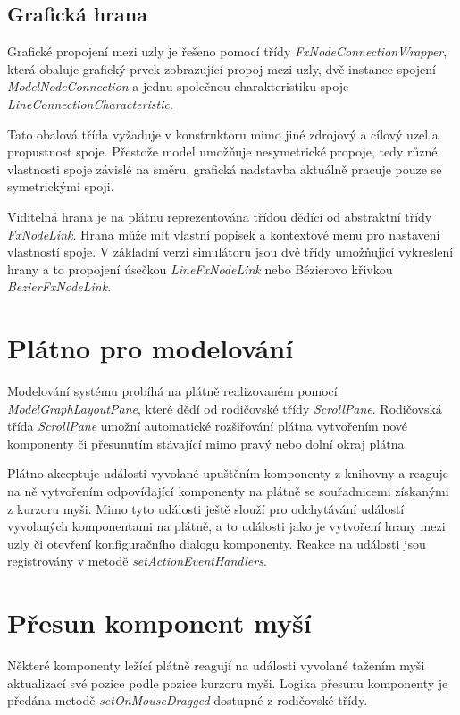 \documentclass[czech,DP]{thesiskiv}
\begin{document}
\subsection{Grafická hrana}

Grafické propojení mezi uzly je řešeno pomocí třídy \textit{FxNodeConnectionWrapper}, která obaluje grafický prvek zobrazující propoj mezi uzly, dvě instance spojení \textit{ModelNodeConnection} a jednu společnou charakteristiku spoje \textit{LineConnectionCharacteristic}.

Tato obalová třída vyžaduje v konstruktoru mimo jiné zdrojový a cílový uzel a propustnost spoje. Přestože model umožňuje nesymetrické propoje, tedy různé vlastnosti spoje závislé na směru, grafická nadstavba aktuálně pracuje pouze se symetrickými spoji.
 
Viditelná hrana je na plátnu reprezentována třídou dědící od abstraktní třídy \textit{FxNodeLink}. Hrana může mít vlastní popisek a kontextové menu pro nastavení vlastností spoje. V základní verzi simulátoru jsou dvě třídy umožňující vykreslení hrany a to propojení úsečkou \textit{LineFxNodeLink} nebo Bézierovo křivkou \textit{BezierFxNodeLink}.

\section{Plátno pro modelování}

Modelování systému probíhá na plátně realizovaném pomocí \textit{ModelGraphLayoutPane}, které dědí od rodičovské třídy \textit{ScrollPane}. Rodičovská třída \textit{ScrollPane} umožní automatické rozšiřování plátna vytvořením nové komponenty či přesunutím stávající mimo pravý nebo dolní okraj plátna.

Plátno akceptuje události vyvolané upuštěním komponenty z knihovny a reaguje na ně vytvořením odpovídající komponenty na plátně se souřadnicemi získanými z kurzoru myši. Mimo tyto události ještě slouží pro odchytávání událostí vyvolaných komponentami na plátně, a to události jako je vytvoření hrany mezi uzly či otevření konfiguračního dialogu komponenty. Reakce na události jsou registrovány v metodě \textit{setActionEventHandlers}.

\section{Přesun komponent myší}

Některé komponenty ležící plátně reagují na události vyvolané tažením myši aktualizací své pozice podle pozice kurzoru myši. Logika přesunu komponenty je předána metodě \textit{setOnMouseDragged} dostupné z rodičovské třídy. 
\end{document}
